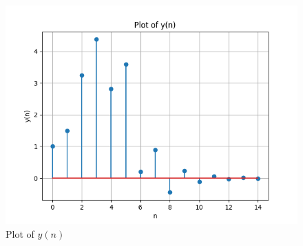 \documentclass[journal,12pt,twocolumn]{IEEEtran}
\theoremstyle{remark}
\begin{document}
\begin{enumerate}[label=\thesection.\arabic*,ref=\thesection.\theenumi]
\begin{lstlisting}
\end{lstlisting}
\begin{figure}[H]
    \includegraphics[width=0.8\columnwidth]{figs/2_2.png}
    \caption{Plot of $y(n)$}
    \label{fig:2.2_plot}
\end{figure}
\end{enumerate}
\end{document}
